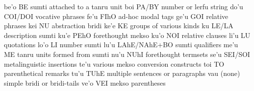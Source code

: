 be'o    BE      sumti attached to a tanru unit
    boi     PA/BY       number or lerfu string
    do'u    COI/DOI     vocative phrases
    fe'u    FIhO        ad-hoc modal tags
    ge'u    GOI     relative phrases
    kei     NU      abstraction bridi
    ke'e    KE      groups of various kinds
    ku      LE/LA       description sumti
    ku'e    PEhO        forethought mekso
    ku'o    NOI     relative clauses
    li'u    LU      quotations
    lo'o    LI      number sumti
    lu'u    LAhE/NAhE+BO    sumti qualifiers
    me'u    ME      tanru units formed from sumti
    nu'u    NUhI        forethought termsets
    se'u    SEI/SOI     metalinguistic insertions
    te'u    various     mekso conversion constructs
    toi     TO      parenthetical remarks
    tu'u    TUhE        multiple sentences or paragraphs
    vau     (none)      simple bridi or bridi-tails
    ve'o    VEI     mekso parentheses
